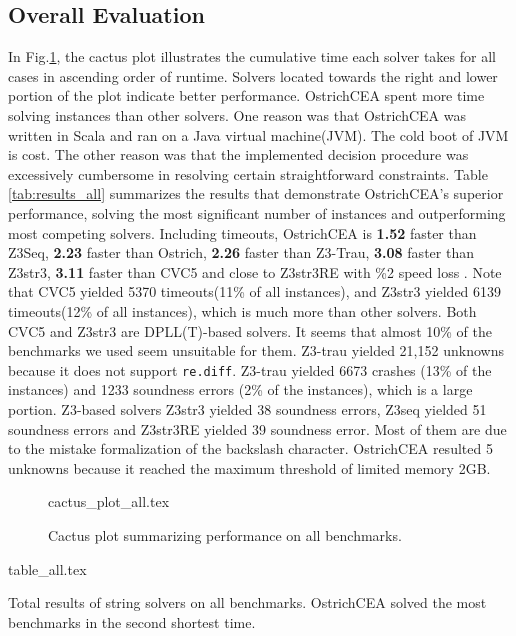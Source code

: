 \documentclass{standalone}
\begin{document}
\subsection{Overall Evaluation}
In Fig.\ref{fig:cactus_all}, the cactus plot illustrates the cumulative time each solver takes for all cases in ascending order of runtime. Solvers located towards the right and lower portion of the plot indicate better performance. OstrichCEA spent more time solving instances than other solvers. One reason was that OstrichCEA was written in Scala and ran on a Java virtual machine(JVM). The cold boot of JVM is cost. The other reason was that the implemented decision procedure was excessively cumbersome in resolving certain straightforward constraints. \newline
Table \ref{tab:results_all} summarizes the results that demonstrate OstrichCEA's superior performance, solving the most significant number of instances and outperforming most competing solvers. Including timeouts, OstrichCEA is \textbf{1.52}\mult{} faster than Z3Seq, \textbf{2.23}\mult{} faster than Ostrich, \textbf{2.26}\mult{} faster than Z3-Trau, \textbf{3.08}\mult{} faster than Z3str3, \textbf{3.11}\mult{} faster than CVC5 and close to Z3str3RE with \%2 speed loss . Note that CVC5\cite{cvc5} yielded 5370 timeouts(11\% of all instances), and Z3str3\cite{z3str3} yielded 6139 timeouts(12\% of all instances), which is much more than other solvers. Both CVC5 and Z3str3 are DPLL(T)-based solvers. It seems that almost 10\% of the benchmarks we used seem unsuitable for them. Z3-trau\cite{z3trau} yielded 21,152 unknowns because it does not support \verb|re.diff|. Z3-trau\cite{z3trau} yielded 6673 crashes (13\% of the instances) and 1233 soundness errors (2\% of the instances), which is a large portion. Z3-based solvers Z3str3 yielded 38 soundness errors, Z3seq\cite{z3seq} yielded 51 soundness errors and Z3str3RE\cite{z3str3re} yielded 39 soundness error. Most of them are due to the mistake formalization of the backslash character. OstrichCEA resulted 5 unknowns because it reached the maximum threshold of limited memory 2GB.

\begin{figure}[h]
  \centering
  {cactus_plot_all.tex}
  \caption{Cactus plot summarizing performance on all benchmarks.}
  \label{fig:cactus_all}
\end{figure}
\begin{table}
  {table_all.tex}
  \caption{Total results of string solvers on all benchmarks. OstrichCEA solved the most benchmarks in the second shortest time.}
  \label{tab:results_all}
\end{table}
\end{document}
